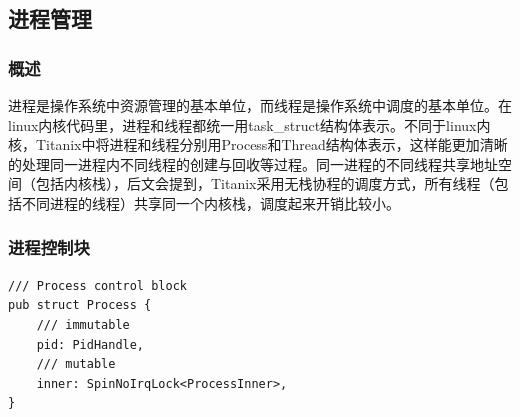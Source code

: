 \subsection{进程管理}

\subsubsection{概述}
进程是操作系统中资源管理的基本单位，而线程是操作系统中调度的基本单位。在linux内核代码里，进程和线程都统一用task\_struct结构体表示。不同于linux内核，Titanix中将进程和线程分别用Process和Thread结构体表示，这样能更加清晰的处理同一进程内不同线程的创建与回收等过程。同一进程的不同线程共享地址空间（包括内核栈），后文会提到，Titanix采用无栈协程的调度方式，所有线程（包括不同进程的线程）共享同一个内核栈，调度起来开销比较小。

\subsubsection{进程控制块}

\begin{tcolorbox}[title=\textbf{os/src/process/mod.rs}]
\begin{verbatim}
/// Process control block
pub struct Process {
    /// immutable
    pid: PidHandle,
    /// mutable
    inner: SpinNoIrqLock<ProcessInner>,
}
\end{verbatim}
\end{tcolorbox}


